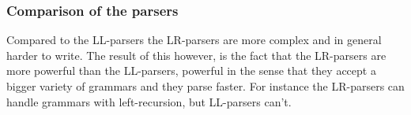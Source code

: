 \subsubsection{Comparison of the parsers}
Compared to the LL-parsers the LR-parsers are more complex and in general harder to write. The result of this however, is the fact that the LR-parsers are more powerful than the LL-parsers, powerful in the sense that they accept a bigger variety of grammars and they parse faster. For instance the LR-parsers can handle grammars with left-recursion, but LL-parsers can't.            
